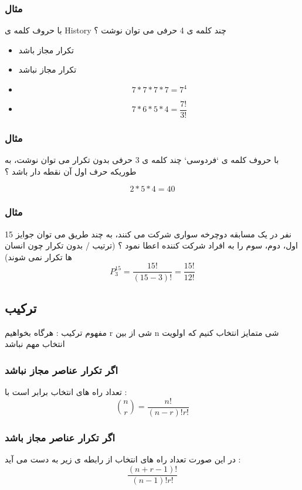 \documentclass[12pt]{book}
\begin{document}
\subsubsection{مثال}
با حروف کلمه ی History چند کلمه ی 4 حرفی می توان نوشت ؟
\begin{itemize}
	\item تکرار مجاز باشد
	\item تکرار مجاز نباشد
\end{itemize}


\begin{itemize}
	\item 
	$$
	7 * 7 * 7 * 7 = 7^{4}
	$$
	\item 
	$$
	7 * 6 * 5 * 4 = \frac{7!}{3!}
	$$
\end{itemize}




\subsubsection{مثال}
با حروف کلمه ی `فردوسی` چند کلمه ی 3 حرفی بدون تکرار می توان نوشت، به طوریکه حرف اول آن نقطه دار باشد ؟

$$
2 * 5 * 4 = 40
$$


\subsubsection{مثال}
15 نفر در یک مسابقه دوچرخه سواری شرکت می کنند، به چند طریق می توان جوایز اول، دوم، سوم را به افراد شرکت کننده اعطا نمود ؟ (ترتیب / بدون تکرار چون انسان ها تکرار نمی شوند)
$$
P^{15}_{3} = \frac{15!}{(15-3)!} = \frac{15!}{12!}
$$

\subsection{ترکیب}

مفهوم ترکیب : هرگاه بخواهیم r شی از بین n شی متمایز انتخاب کنیم که اولویت انتخاب مهم نباشد 

\subsubsection{اگر تکرار عناصر مجاز نباشد}
تعداد راه های انتخاب برابر است با :
$$
\binom{n}{r} = \frac{n!}{(n-r)!r!}
$$



\subsubsection{اگر تکرار عناصر مجاز باشد}
در این صورت تعداد راه های انتخاب از رابطه ی زیر به دست می آید :
$$
\frac{(n+r-1)!}{(n-1)!r!}
$$
\end{document}
